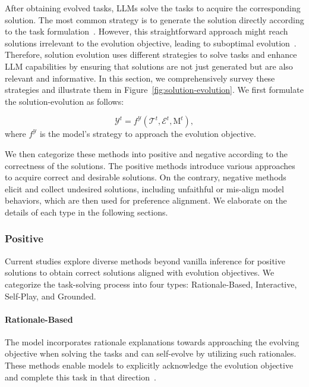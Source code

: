 \documentclass[sn-basic, Numbered]{sn-jnl}%
\def\gE{{\mathcal{E}}}
\def\gT{{\mathcal{T}}}
\def\gY{{\mathcal{Y}}}
\theoremstyle{thmstyleone}%
\theoremstyle{thmstyletwo}%
\theoremstyle{thmstylethree}%
\begin{document}
After obtaining evolved tasks, LLMs solve the tasks to acquire the corresponding solution. 
The most common strategy is to generate the solution directly according to the task formulation~\cite{zelikman2022star,gulcehre2023reinforced,singh2023beyond,zheng2024kun,yuan2024self}.
However, this straightforward approach might reach solutions irrelevant to the evolution objective, leading to suboptimal evolution~\cite{hare2019dealing}.
Therefore, solution evolution uses different strategies to solve tasks and enhance LLM capabilities by ensuring that solutions are not just generated but are also relevant and informative. 
In this section, we comprehensively survey these strategies and illustrate them in Figure~\ref{fig:solution-evolution}.
We first formulate the solution-evolution as follows:

\begin{equation}
    \gY^{t} = f^{\gY}(\gT^{t}, \gE^{t}, \mathrm{M}^{t}),
\end{equation}
where $f^{\gY}$ is the model's strategy to approach the evolution objective. 

We then categorize these methods into positive and negative according to the correctness of the solutions.
The positive methods introduce various approaches to acquire correct and desirable solutions.
On the contrary, negative methods elicit and collect undesired solutions, including unfaithful or mis-align model behaviors, which are then used for preference alignment.
We elaborate on the details of each type in the following sections.

\subsubsection{Positive}
Current studies explore diverse methods beyond vanilla inference for positive solutions to obtain correct solutions aligned with evolution objectives.
We categorize the task-solving process into four types: Rationale-Based, Interactive, Self-Play, and Grounded.

\noindent\paragraph{Rationale-Based}
The model incorporates rationale explanations towards approaching the evolving objective when solving the tasks and can self-evolve by utilizing such rationales.
These methods enable models to explicitly acknowledge the evolution objective and complete this task in that direction~\cite{wei2022chain, yao2024tree, besta2024graph, yao2022react}. 
\end{document}
